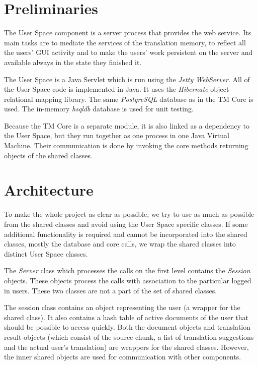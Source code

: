 \label{chap:userspace}
\section{Preliminaries}

The User Space component is a server process that provides the web service. Its main tasks are to mediate the services of the translation memory, to reflect all the users' GUI activity and to make the users' work persistent on the server and available always in the state they finished it.

The User Space is a Java Servlet which is run using the \emph{Jetty WebServer}. All of the User Space code is implemented in Java. It uses the \emph{Hibernate} object-relational mapping library. The same \emph{PostgreSQL} database as in the TM Core is used. The in-memory \emph{hsqldb} database is used for unit testing.

Because the TM Core is a separate module, it is also linked as a dependency to the User Space, but they run together as one process in one Java Virtual Machine. Their communication is done by invoking the core methods returning objects of the shared classes.

\section{Architecture}

To make the whole project as clear as possible, we try to use as much as possible from the shared classes and avoid using the User Space specific classes. If some additional functionality is required and cannot be incorporated into the shared classes, mostly the database and core calls, we wrap the shared classes into distinct User Space classes.

The \emph{Server} class which processes the calls on the first level contains the {\it Session} objects. These objects process the calls with association to the particular logged in users. These two classes are not a part of the set of shared classes.

The session class contains an object representing the user (a wrapper for the shared class). It also contains a hash table of active documents of the user that should be possible to access quickly.
Both the document objects and translation result objects (which consist of the source chunk, a list of translation suggestions and the actual user's translation) are wrappers for the shared classes. However, the inner shared objects are used for communication with other components.

